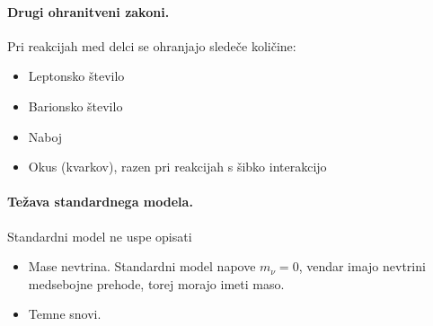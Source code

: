 \documentclass[a4paper]{article}
\begin{document}
\paragraph{Drugi ohranitveni zakoni.} Pri reakcijah med delci se ohranjajo sledeče količine:
\begin{itemize}
    \item Leptonsko število
    \item Barionsko število
    \item Naboj
    \item Okus (kvarkov), razen pri reakcijah s šibko interakcijo
\end{itemize}
\paragraph{Težava standardnega modela.} Standardni model ne uspe opisati
\begin{itemize}
    \item Mase nevtrina. Standardni model napove \(m_\nu = 0\), vendar imajo nevtrini medsebojne prehode, torej morajo imeti maso.
    \item Temne snovi.
\end{itemize}
\end{document}

